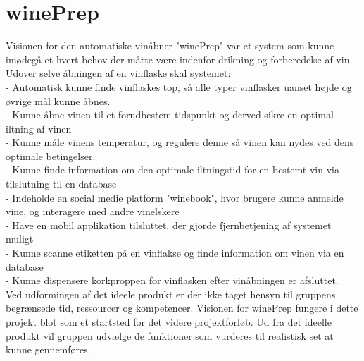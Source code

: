 \section{winePrep}
Visionen for den automatiske vinåbner "winePrep" var et system som kunne imødegå et hvert behov der måtte være indenfor drikning og forberedelse af vin. \\
Udover selve åbningen af en vinflaske skal systemet:\\
- Automatisk kunne finde vinflaskes top, så alle typer vinflasker uanset højde og øvrige mål kunne åbnes.\\ 
- Kunne åbne vinen til et forudbestem tidspunkt og derved sikre en optimal iltning af vinen\\
- Kunne måle vinens temperatur, og regulere denne så vinen kan nydes ved dens optimale betingelser.\\
- Kunne finde information om den optimale iltningstid for en bestemt vin via tilslutning til en database\\
- Indeholde en social medie platform "winebook", hvor brugere kunne anmelde vine, og interagere med andre vinelskere\\
- Have en mobil applikation tilsluttet, der gjorde fjernbetjening af systemet muligt\\
- Kunne scanne etiketten på en vinflakse og finde information om vinen via en database\\
- Kunne dispensere korkproppen for vinflasken efter vinåbningen er afsluttet.\\

Ved udformingen af det ideele produkt er der ikke taget hensyn til gruppens begrænsede tid, ressourcer og kompetencer. Visionen for winePrep fungere
i dette projekt blot som et startsted for det videre projektforløb. Ud fra det ideelle produkt vil gruppen udvælge de funktioner som vurderes til realistisk
set at kunne gennemføres. 